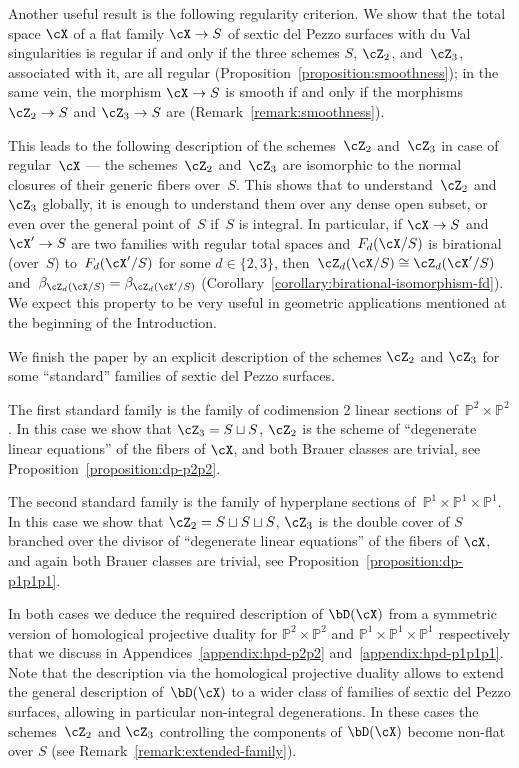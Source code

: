 \documentclass[11pt]{amsart}
\renewcommand{\P}{{\mathbb{P}}}
\theoremstyle{plain}
\theoremstyle{definition}
\theoremstyle{remark}
\begin{document}
Another useful result is the following regularity criterion.
We show that the total space $\cX$ of a flat family $\cX \to S$ of sextic del Pezzo surfaces with du Val singularities is regular 
if and only if the three schemes $S$, $\cZ_2$, and~$\cZ_3$, associated with it, are all regular (Proposition~\ref{proposition:smoothness});
in the same vein, the morphism $\cX \to S$ is smooth 
if and only if the morphisms $\cZ_2 \to S$ and $\cZ_3 \to S$ are (Remark~\ref{remark:smoothness}).

This leads to the following description of the schemes~$\cZ_2$ and~$\cZ_3$ in case of regular~$\cX$ --- 
the schemes~$\cZ_2$ and~$\cZ_3$ are isomorphic to the normal closures of their generic fibers over~$S$.
This shows that to understand~$\cZ_2$ and~$\cZ_3$ globally, it is enough to understand them over any dense open subset, 
or even over the general point of~$S$ if~$S$ is integral.
In particular, if $\cX \to S$ and $\cX' \to S$ are two families with regular total spaces 
and~$F_d(\cX/S)$ is birational (over~$S$) to~$F_d(\cX'/S)$ for some $d \in \{2, 3\}$, 
then~$\cZ_d(\cX/S) \cong \cZ_d(\cX'/S)$ and~$\beta_{\cZ_d(\cX/S)} = \beta_{\cZ_d(\cX'/S)}$ 
(Corollary~\ref{corollary:birational-isomorphism-fd}).
We expect this property to be very useful in geometric applications mentioned at the beginning of the Introduction.


We finish the paper by an explicit description of the schemes $\cZ_2$ and $\cZ_3$ for some ``standard'' families of sextic del Pezzo surfaces.

The first standard family is the family of codimension 2 linear sections of~$\P^2 \times \P^2$.
In this case we show that $\cZ_3 = S \sqcup S$, $\cZ_2$ is the scheme of ``degenerate linear equations'' of the fibers of $\cX$, 
and both Brauer classes are trivial, see Proposition~\ref{proposition:dp-p2p2}.

The second standard family is the family of hyperplane sections of~$\P^1 \times \P^1  \times \P^1$.
In this case we show that $\cZ_2 = S \sqcup S \sqcup S$, $\cZ_3$ is the double cover of $S$ branched over the divisor of ``degenerate linear equations'' of the fibers of $\cX$, 
and again both Brauer classes are trivial, see Proposition~\ref{proposition:dp-p1p1p1}.

In both cases we deduce the required description of $\bD(\cX)$ from a symmetric version of homological projective duality 
for $\P^2 \times \P^2$ and $\P^1 \times \P^1 \times \P^1$ respectively that we discuss in Appendices~\ref{appendix:hpd-p2p2}
and~\ref{appendix:hpd-p1p1p1}.
Note that the description via the homological projective duality allows to extend the general description of~$\bD(\cX)$ 
to a wider class of families of sextic del Pezzo surfaces, allowing in particular non-integral degenerations. 
In these cases the schemes~$\cZ_2$ and $\cZ_3$ controlling the components of $\bD(\cX)$ become non-flat over $S$ (see Remark~\ref{remark:extended-family}).
\end{document}

